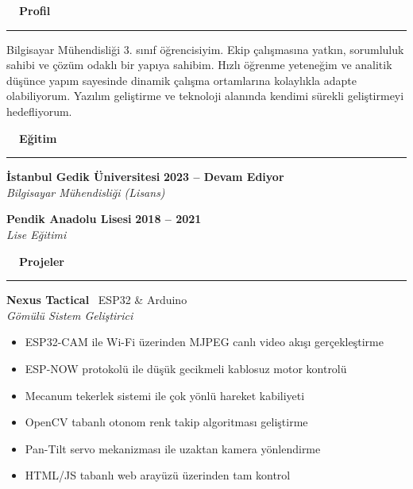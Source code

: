 \documentclass[9pt,a4paper]{article}
\newcommand{\mainsection}[2]{%
    \vspace{1.2ex}%
    {\Large\bfseries\color{accentblue} #1\ \ #2}\par%
    \vspace{0.3ex}%
    {\color{rulecolor}\rule{\linewidth}{1.5pt}}\par%
    \vspace{0.8ex}%
}
\begin{document}
\begin{minipage}[t][\paperheight]{14.1cm}
    \vspace{0pt}
    \hspace{0.6cm}%
    \begin{minipage}[t]{12.6cm}
        \color{maintext}
        \raggedright

        \vspace{1ex}

        \mainsection{\faUser}{Profil}
        Bilgisayar Mühendisliği 3. sınıf öğrencisiyim. Ekip çalışmasına yatkın, sorumluluk sahibi ve çözüm odaklı bir yapıya sahibim. Hızlı öğrenme yeteneğim ve analitik düşünce yapım sayesinde dinamik çalışma ortamlarına kolaylıkla adapte olabiliyorum. Yazılım geliştirme ve teknoloji alanında kendimi sürekli geliştirmeyi hedefliyorum.

        \mainsection{\faUserGraduate}{Eğitim}

        \textbf{\large \color{maintext} İstanbul Gedik Üniversitesi} \hfill \textbf{\color{accentblue}2023 -- Devam Ediyor} \\
        \textit{\color{lightgray}Bilgisayar Mühendisliği (Lisans)}

        \vspace{0.8ex}

        \textbf{\large \color{maintext} Pendik Anadolu Lisesi} \hfill \textbf{\color{accentblue}2018 -- 2021} \\
        \textit{\color{lightgray}Lise Eğitimi}



        \mainsection{\faCode}{Projeler}

        \textbf{\large \color{maintext} Nexus Tactical} \hfill {\color{lightgray}\faMicrochip\ ESP32 \& Arduino} \\
        {\color{accentblue}\textit{Gömülü Sistem Geliştirici}}
        \begin{itemize}[leftmargin=1.2em, itemsep=0.1ex, parsep=0pt, topsep=0.3ex, label={\textcolor{accentblue}{\scriptsize\faAngleRight}}]
            \item ESP32-CAM ile Wi-Fi üzerinden MJPEG canlı video akışı gerçekleştirme
            \item ESP-NOW protokolü ile düşük gecikmeli kablosuz motor kontrolü
            \item Mecanum tekerlek sistemi ile çok yönlü hareket kabiliyeti
            \item OpenCV tabanlı otonom renk takip algoritması geliştirme
            \item Pan-Tilt servo mekanizması ile uzaktan kamera yönlendirme
            \item HTML/JS tabanlı web arayüzü üzerinden tam kontrol
        \end{itemize}


\end{minipage}
\end{minipage}
\end{document}
